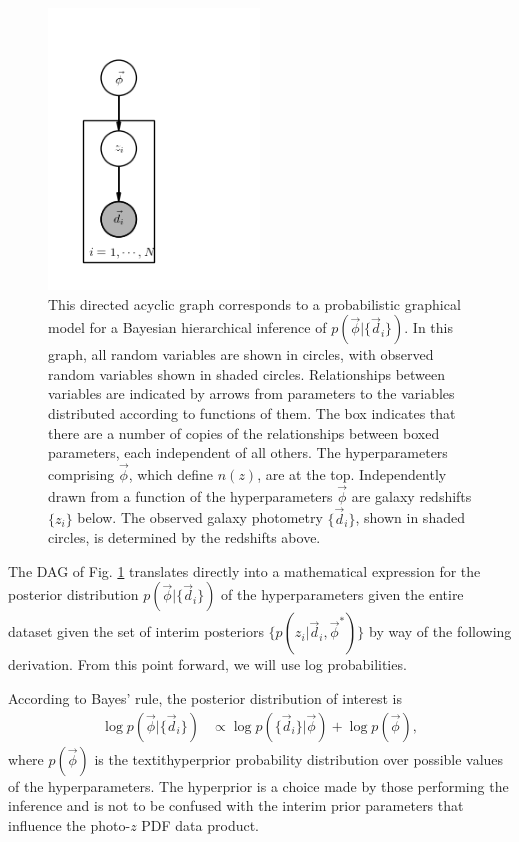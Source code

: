 \documentclass[iop]{emulateapj}
\begin{document}
\begin{figure}
	\begin{center}
		\includegraphics[width=0.5\textwidth]{pgm.png}
		\caption{This directed acyclic graph corresponds to a 
probabilistic graphical model for a Bayesian hierarchical inference of 
$p(\vec{\phi}|\{\vec{d}_{i}\})$.  In this graph, all random variables are shown 
in circles, with observed random variables shown in shaded circles.  
Relationships between variables are indicated by arrows from parameters to the 
variables distributed according to functions of them.  The box indicates that 
there are a number of copies of the relationships between boxed parameters, 
each independent of all others.  The hyperparameters comprising $\vec{\phi}$, 
which define $n(z)$, are at the top.  Independently drawn from a function of 
the hyperparameters $\vec{\phi}$ are galaxy redshifts $\{z_{i}\}$ below.  The 
observed galaxy photometry $\{\vec{d}_{i}\}$, shown in shaded circles, is 
determined by the redshifts above.}
	\label{fig:pgm}
	\end{center}
\end{figure}



The DAG of Fig. \ref{fig:pgm} translates directly into a mathematical 
expression for the posterior distribution $p(\vec{\phi} | \{\vec{d}_{i}\})$ of 
the hyperparameters given the entire dataset given the set of interim 
posteriors $\{p(z_{i} | \vec{d}_{i}, \vec{\phi}^{*})\}$ by way of the following 
derivation.  From this point forward, we will use log probabilities.

According to Bayes' rule, the posterior distribution of interest is
\begin{align}
\log p(\vec{\phi} | \{\vec{d}_{i}\}) &\propto \log p(\{\vec{d}_{i}\} | 
\vec{\phi}) + \log p(\vec{\phi}),
\end{align}
where $p(\vec{\phi})$ is the textit{hyperprior} probability distribution over 
possible values of the hyperparameters.  The hyperprior is a choice made by 
those performing the inference and is not to be confused with the interim prior 
parameters that influence the photo-$z$ PDF data product.
\end{document}
